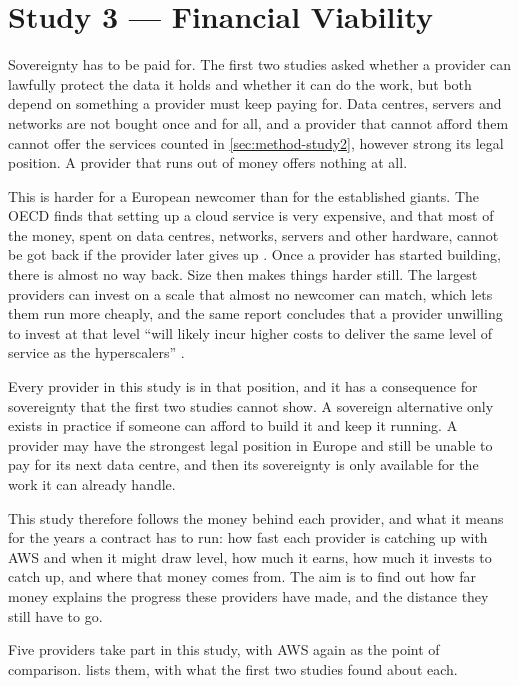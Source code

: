 \section{Study 3 --- Financial Viability}
\label{sec:method-study3}

Sovereignty has to be paid for. The first two studies asked whether a provider can
lawfully protect the data it holds and whether it can do the work, but both depend
on something a provider must keep paying for. Data centres, servers and networks
are not bought once and for all, and a provider that cannot afford them cannot
offer the services counted in \cref{sec:method-study2}, however strong its legal
position. A provider that runs out of money offers nothing at all.

This is harder for a European newcomer than for the established giants. The
\ac{OECD} finds that setting up a cloud service is very expensive, and that most of
the money, spent on data centres, networks, servers and other hardware, cannot be
got back if the provider later gives up \cite{OECD_CloudCompetition_2025}. Once a
provider has started building, there is almost no way back. Size then makes things
harder still. The largest providers can invest on a scale that almost no newcomer
can match, which lets them run more cheaply, and the same report concludes that a
provider unwilling to invest at that level \enquote{will likely incur higher costs
to deliver the same level of service as the hyperscalers}
\cite{OECD_CloudCompetition_2025}.

Every provider in this study is in that position, and it has a consequence for
sovereignty that the first two studies cannot show. A sovereign alternative only
exists in practice if someone can afford to build it and keep it running. A
provider may have the strongest legal position in Europe and still be unable to pay
for its next data centre, and then its sovereignty is only available for the work
it can already handle.

This study therefore follows the money behind each provider, and what it means
for the years a contract has to run: how fast each provider is catching up with
\acs{AWS} and when it might draw level, how much it earns, how much it invests to
catch up, and where that money comes from. The aim is to find out how far money
explains the progress these providers have made, and the distance they still have
to go.

Five providers take part in this study, with \acs{AWS} again as the point of
comparison.  lists them, with what the first two studies
found about each.

